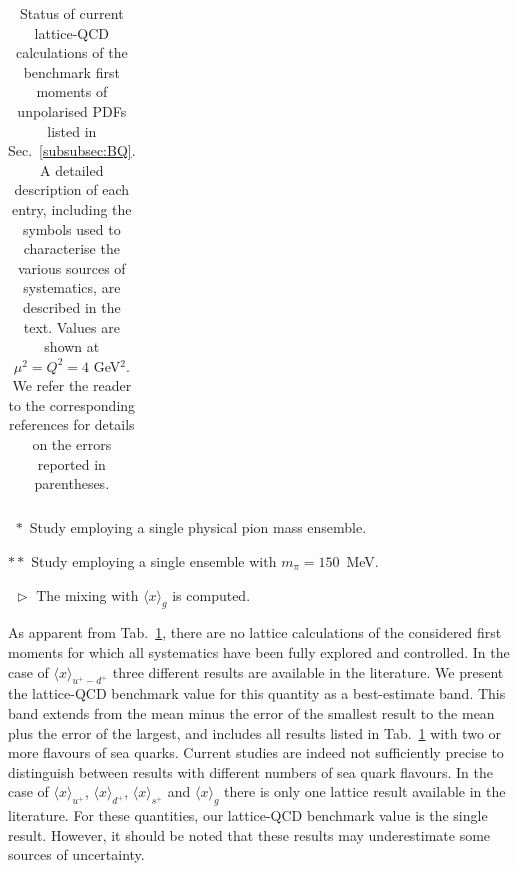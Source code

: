 \begin{table}[!t]
\begin{threeparttable}
\begin{tabular}{llcllccccccl}
\bottomrule
\end{tabular}
\begin{tablenotes}
\footnotesize
\item[$\ \,*$] Study employing a single physical pion mass ensemble.
\item[$**$] Study employing a single ensemble with $m_\pi=150$~MeV.
\item[$\ \,\triangleright$] The mixing with $\langle x\rangle_{g}$ is computed.
\end{tablenotes}
\end{threeparttable}
\caption{\small Status of current lattice-QCD calculations of the benchmark 
first moments of unpolarised PDFs listed in Sec.~\ref{subsubsec:BQ}.
%
A detailed description of each entry, including the symbols used to 
characterise the various sources of systematics, are described in the text.
%
Values are shown at $\mu^2=Q^2=4$ GeV$^2$.
%
We refer the reader to the corresponding references for details on the 
errors reported in parentheses.}
\label{tab:unpolLQCDstatus1}
\end{table}

As apparent from Tab.~\ref{tab:unpolLQCDstatus1}, there are no lattice 
calculations of the considered first moments for which all systematics 
have been fully explored and controlled. 
%
In the case of $\langle x\rangle_{u^+-d^+}$ three different results are available 
in the literature.
%
We present the lattice-QCD benchmark value for this quantity 
as a best-estimate band.
% 
This band extends from the mean minus the error of the smallest result to the 
mean plus the error of the largest, and includes all results listed in 
Tab.~\ref{tab:unpolLQCDstatus1} with two or more flavours of sea quarks.
%
Current studies are indeed not sufficiently precise to distinguish between 
results with different numbers of sea quark flavours.
%
In the case of $\langle x \rangle_{u^+}$, $\langle x \rangle_{d^+}$, 
$\langle x \rangle_{s^+}$ and $\langle x \rangle_g$ there is only one
lattice result available in the literature. 
%
For these quantities, our lattice-QCD benchmark value is the single result.
% 
However, it should be noted that these results may underestimate some sources 
of uncertainty. 


